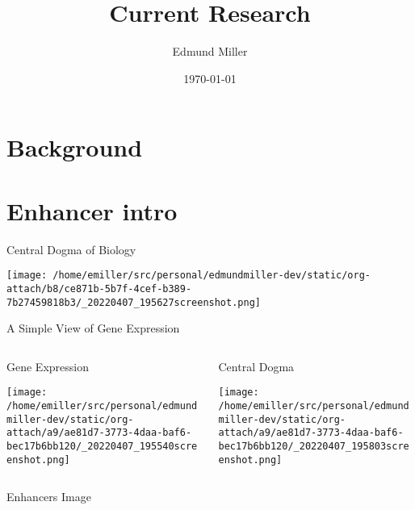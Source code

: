 \documentclass[presentation]{beamer}
\author{Edmund Miller}
\date{\today}
\title{Current Research}
\begin{document}
\maketitle

\section*{Background}
\label{sec:org02c0ebf}
\section*{Enhancer intro}
\label{sec:orga79c09e}
\begin{frame}[label={sec:org8013042}]{Central Dogma of Biology}
\begin{center}
\texttt{[image: /home/emiller/src/personal/edmundmiller-dev/static/org-attach/b8/ce871b-5b7f-4cef-b389-7b27459818b3/\_20220407\_195627screenshot.png]}
\end{center}
\end{frame}

\begin{frame}[label={sec:orgf168fd4}]{A Simple View of Gene Expression}
\begin{columns}
\begin{column}{0.45\columnwidth}
\begin{block}{Gene Expression}
\begin{center}
\texttt{[image: /home/emiller/src/personal/edmundmiller-dev/static/org-attach/a9/ae81d7-3773-4daa-baf6-bec17b6bb120/\_20220407\_195540screenshot.png]}
\end{center}
\end{block}
\end{column}


\begin{column}{0.45\columnwidth}
\begin{block}{Central Dogma}
\begin{center}
\texttt{[image: /home/emiller/src/personal/edmundmiller-dev/static/org-attach/a9/ae81d7-3773-4daa-baf6-bec17b6bb120/\_20220407\_195803screenshot.png]}
\end{center}
\end{block}
\end{column}
\end{columns}
\end{frame}


\begin{frame}[label={sec:orgefc5d0a}]{Enhancers Image}
\end{frame}
\end{document}
